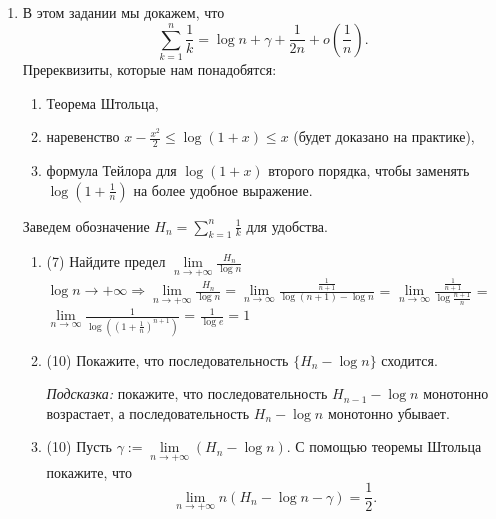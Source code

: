 \documentclass[a4paper]{article}
\begin{document}
\renewcommand{\labelenumii}{\arabic{enumii})}
\renewcommand{\labelenumiii}{\roman{enumiii})}




\begin{enumerate}
    
    \item В этом задании мы докажем, что 
    \[
        \sum\limits_{k = 1}^n \frac{1}{k} = \log n + \gamma + \frac{1}{2n} + o\left( \frac{1}{n} \right).
    \]
    Пререквизиты, которые нам понадобятся:
    \begin{enumerate}[label=(\arabic*)]
        \item Теорема Штольца,
        \item наревенство $x-\frac{x^2}{2}\leq \log (1+x)\leq x$ (будет доказано на практике),
        \item формула Тейлора для $\log(1+x)$ второго порядка, чтобы заменять $\log\left(1 + \frac{1}{n}\right)$ на более удобное выражение.
    \end{enumerate}
    Заведем обозначение $H_n = \sum\limits_{k = 1}^n \frac{1}{k}$ для удобства.
    \begin{enumerate}
        \item (7) Найдите предел $\lim\limits_{n\to +\infty}\frac{H_n}{\log n}$\\
        $\log n \to +\infty \Rightarrow \lim\limits_{n\to +\infty}\frac{H_n}{\log n} = \lim\limits_{n\to\infty} \frac{\frac{1}{n+1}}{\log (n+1) - \log n}$ 
        = $\lim\limits_{n\to\infty} \frac{\frac{1}{n+1}}{\log \frac{n+1}{n}}$ = 
        $\lim\limits_{n\to\infty} \frac{1}{\log ((1 + \frac{1}{n})^{n+1})}$ = 
        $\frac{1}{\log e} = 1$
        \item (10) Покажите, что последовательность $\{H_n - \log n\}$ сходится.
        
        \noindent\emph{Подсказка:} покажите, что последовательность $H_{n-1} - \log n$ монотонно возрастает, а последовательность $H_n - \log n$ монотонно убывает.
        
        \item (10) Пусть $\gamma:= \lim\limits_{n\to +\infty} (H_n - \log n)$. С помощью теоремы Штольца покажите, что
        \[
            \lim\limits_{n\to +\infty}n(H_n - \log n - \gamma) = \frac{1}{2}.
        \]
    \end{enumerate}
    

\end{enumerate}
\end{document}
